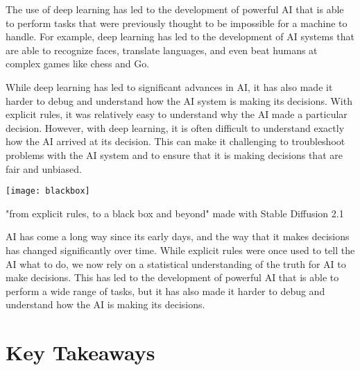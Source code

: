 The use of deep learning has led to the development of powerful AI that is able to perform tasks that were previously thought to be impossible for a machine to handle. For example, deep learning has led to the development of AI systems that are able to recognize faces, translate languages, and even beat humans at complex games like chess and Go.

While deep learning has led to significant advances in AI, it has also made it harder to debug and understand how the AI system is making its decisions. With explicit rules, it was relatively easy to understand why the AI made a particular decision. However, with deep learning, it is often difficult to understand exactly how the AI arrived at its decision. This can make it challenging to troubleshoot problems with the AI system and to ensure that it is making decisions that are fair and unbiased.

\begin{pdf}
\begin{marginfigure}[-5.5cm]
        \texttt{[image: blackbox]}
        \caption{"from explicit rules, to a black box and beyond" made with Stable Diffusion 2.1}
\end{marginfigure}
\end{pdf}

AI has come a long way since its early days, and the way that it makes decisions has changed significantly over time. While explicit rules were once used to tell the AI what to do, we now rely on a statistical understanding of the truth for AI to make decisions. This has led to the development of powerful AI that is able to perform a wide range of tasks, but it has also made it harder to debug and understand how the AI is making its decisions.


\section{Key Takeaways}

